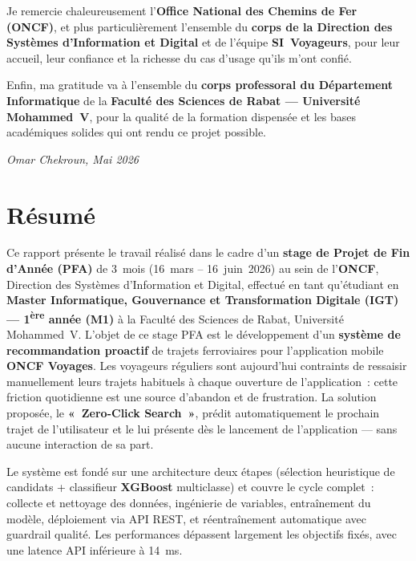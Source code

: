 \documentclass[12pt, a4paper]{report}
\begin{document}
Je remercie chaleureusement l'\textbf{Office National des Chemins de
Fer (ONCF)}, et plus particulièrement l'ensemble du \textbf{corps de la
Direction des Systèmes d'Information et Digital} et de l'équipe
\textbf{SI~Voyageurs}, pour leur accueil, leur confiance et la richesse
du cas d'usage qu'ils m'ont confié.

Enfin, ma gratitude va à l'ensemble du \textbf{corps professoral du
Département Informatique} de la \textbf{Faculté des Sciences de Rabat
--- Université Mohammed~V}, pour la qualité de la formation dispensée et
les bases académiques solides qui ont rendu ce projet possible.

\vspace{1cm}
\hfill\textit{Omar Chekroun, Mai 2026}

\newpage
\chapter*{Résumé}

Ce rapport présente le travail réalisé dans le cadre d'un \textbf{stage de
Projet de Fin d'Année (PFA)} de 3~mois (16~mars -- 16~juin~2026) au sein de
l'\textbf{ONCF}, Direction des Systèmes d'Information et Digital, effectué
en tant qu'étudiant en \textbf{Master Informatique, Gouvernance et
Transformation Digitale (IGT) --- 1\textsuperscript{ère} année (M1)} à la
Faculté des Sciences de Rabat, Université Mohammed~V. L'objet de ce stage
PFA est le développement d'un
\textbf{système de recommandation proactif} de trajets ferroviaires pour
l'application mobile \textbf{ONCF Voyages}. Les voyageurs réguliers sont
aujourd'hui contraints de ressaisir manuellement leurs trajets habituels à
chaque ouverture de l'application~:
cette friction quotidienne est une source d'abandon et de frustration. La
solution proposée, le \textbf{«~Zero-Click Search~»}, prédit automatiquement
le prochain trajet de l'utilisateur et le lui présente dès le lancement de
l'application --- sans aucune interaction de sa part.

Le système est fondé sur une architecture deux étapes (sélection heuristique
de candidats + classifieur \textbf{XGBoost} multiclasse) et couvre le cycle
complet~: collecte et nettoyage des données, ingénierie de variables, entraîne\-ment
du modèle, déploiement via API REST, et réentraînement automatique avec
guardrail qualité. Les performances dépassent largement les objectifs fixés,
avec une latence API inférieure à 14~ms.
\end{document}
